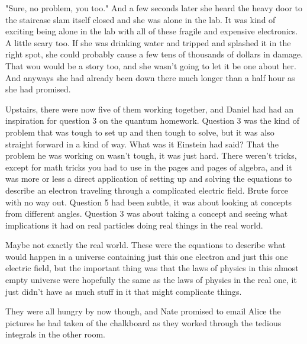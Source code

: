 "Sure, no problem, you too." And a few seconds later she heard the heavy door to the staircase slam itself closed and she was alone in the lab. It was kind of exciting being alone in the lab with all of these fragile and expensive electronics. A little scary too. If she was drinking water and tripped and splashed it in the right spot, she could probably cause a few tens of thousands of dollars in damage. That wou would be a story too, and she wasn't going to let it be one about her. And anyways she had already been down there much longer than a half hour as she had promised.

\mypause

Upstairs, there were now five of them working together, and Daniel had had an inspiration for question 3 on the quantum homework. Question 3 was the kind of problem that was tough to set up and then tough to solve, but it was also straight forward in a kind of way. What was it Einstein had said? That the problem he was working on wasn't tough, it was just hard. There weren't tricks, except for math tricks you had to use in the pages and pages of algebra, and it was more or less a direct application of setting up and solving the equations to describe an electron traveling through a complicated electric field. Brute force with no way out. Question 5 had been subtle, it was about looking at concepts from different angles. Question 3 was about taking a concept and seeing what implications it had on real particles doing real things in the real world. 

Maybe not exactly the real world. These were the equations to describe what would happen in a universe containing just this one electron and just this one electric field, but the important thing was that the laws of physics in this almost empty universe were hopefully the same as the laws of physics in the real one, it just didn't have as much stuff in it that might complicate things. 

They were all hungry by now though, and Nate promised to email Alice the pictures he had taken of the chalkboard as they worked through the tedious integrals in the other room. 

\mypause



